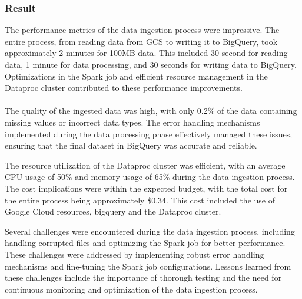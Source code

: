 \subsubsection{Result}
The performance metrics of the data ingestion process were impressive. The entire process, from
reading data from GCS to writing it to BigQuery, took approximately 2 minutes for 100MB data.
This included 30 second for reading data, 1 minute for data processing, and 30 seconds for
writing data to BigQuery. Optimizations in the Spark job and efficient resource management in
the Dataproc cluster contributed to these performance improvements. \\\\
The quality of the ingested data was high, with only 0.2\% of the data containing missing values
or incorrect data types. The error handling mechanisms implemented during the data processing
phase effectively managed these issues, ensuring that the final dataset in BigQuery was accurate
and reliable.

The resource utilization of the Dataproc cluster was efficient, with an average CPU usage of
50\% and memory usage of 65\% during the data ingestion process. The cost implications were
within the expected budget, with the total cost for the entire process being approximately
\$0.34. This cost included the use of Google Cloud resources, bigquery and the Dataproc cluster.

Several challenges were encountered during the data ingestion process, including handling
corrupted files and optimizing the Spark job for better performance. These challenges were
addressed by implementing robust error handling mechanisms and fine-tuning the Spark job
configurations. Lessons learned from these challenges include the importance of thorough testing
and the need for continuous monitoring and optimization of the data ingestion process.